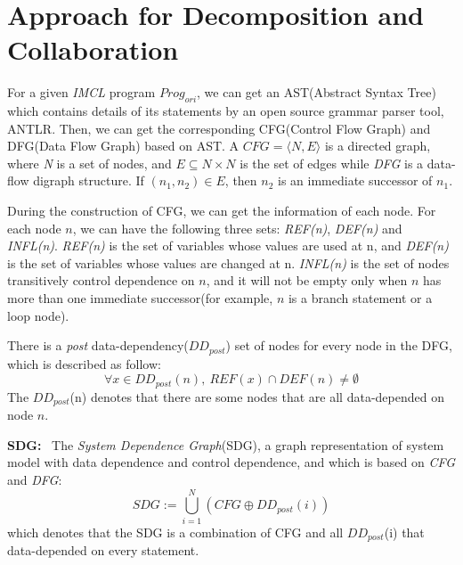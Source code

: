 \section{Approach for Decomposition and Collaboration}
For a given \emph{IMCL} program $Prog_{ori}$, we can get an AST(Abstract Syntax Tree) which contains details of its statements by an open source grammar parser tool, ANTLR\cite{ANTLRbook}.
Then, we can get the corresponding CFG(Control Flow Graph) and DFG(Data Flow Graph) based on AST.
A $CFG = \langle N, E \rangle$ is a directed graph, where \emph{N} is a set of nodes, and $E \subseteq N \times N$ is the set of edges while \emph{DFG} is a data-flow digraph structure. If $(n_1,n_2) \in E$, then $n_2$ is an immediate successor of $n_1$.

During the construction of CFG, we can get the information of each node. For each node $n$, we can have the following three sets: \emph{REF(n)}, \emph{DEF(n)} and \emph{INFL(n)}. \emph{REF(n)} is the set of variables whose values are used at n, and \emph{DEF(n)} is the set of variables whose values are changed at n. \emph{INFL(n)} is the set of nodes transitively control dependence on $n$, and it will not be empty only when $n$ has more than one immediate successor(for example, $n$ is a branch statement or a loop node).

There is a \emph{post} data-dependency($DD_{post}$) set of nodes for every node in the DFG, which is described as follow:\\
\begin{displaymath}
    \forall x \in DD_{post}(n), \ REF(x) \cap DEF(n) \neq \emptyset
\end{displaymath}
The $DD_{post}$(n) denotes that there are some nodes that are all data-depended on node $n$.

\textbf{SDG:} \ The \emph{System Dependence Graph}(SDG), a graph representation of system model with data dependence and control dependence, and which is based on \emph{CFG} and \emph{DFG}:
\begin{displaymath}
    SDG :=  \bigcup_{i=1}^{N} (CFG \oplus DD_{post}(i))
\end{displaymath}
which denotes that the SDG is a combination of CFG and all $DD_{post}$(i) that data-depended on every statement.

